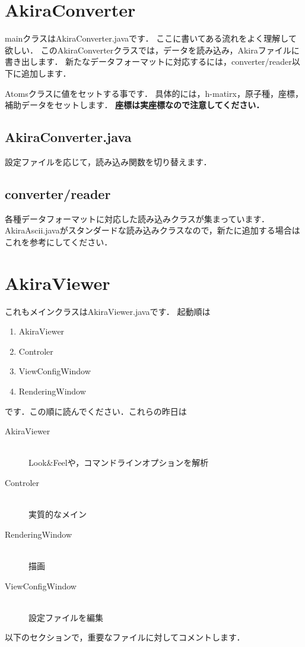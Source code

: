 \documentclass[a4j,openany]{jbook}
\begin{document}
 \section{AkiraConverter}
  mainクラスはAkiraConverter.javaです．
  ここに書いてある流れをよく理解して欲しい．
  このAkiraConverterクラスでは，データを読み込み，Akiraファイルに書き出します．
  新たなデータフォーマットに対応するには，converter/reader以下に追加します．

  Atomsクラスに値をセットする事です．
  具体的には，h-matirx，原子種，座標，補助データをセットします．
  \textbf{座標は実座標なので注意してください．}

  \subsection{AkiraConverter.java}
  設定ファイルを応じて，読み込み関数を切り替えます．
  \subsection{converter/reader}
  各種データフォーマットに対応した読み込みクラスが集まっています．
  AkiraAscii.javaがスタンダードな読み込みクラスなので，新たに追加する場合はこれを参考にしてください．

 \section{AkiraViewer}
  これもメインクラスはAkiraViewer.javaです．
  起動順は
  \begin{enumerate}
   \item AkiraViewer
   \item Controler
   \item ViewConfigWindow
   \item RenderingWindow
  \end{enumerate}
  です．この順に読んでください．これらの昨日は

  \begin{description}
   \item[AkiraViewer] \mbox{} \\
              Look\&Feelや，コマンドラインオプションを解析
   \item[Controler] \mbox{} \\
              実質的なメイン
   \item[RenderingWindow] \mbox{} \\
              描画
   \item[ViewConfigWindow] \mbox {} \\
              設定ファイルを編集
  \end{description}
  以下のセクションで，重要なファイルに対してコメントします．
\end{document}
